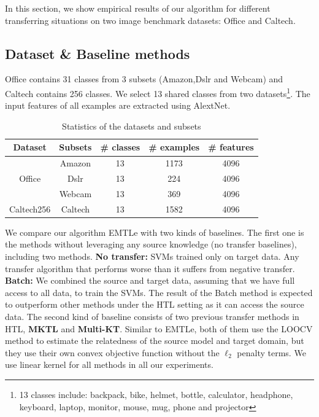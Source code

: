 In this section, we show empirical results of our algorithm for different transferring situations on two image benchmark datasets: Office and Caltech.
\subsection{Dataset \& Baseline methods}
Office contains 31 classes from 3 subsets (Amazon,Dslr and Webcam) and Caltech contains 256 classes. We select 13 shared classes from two datasets\footnote{13 classes include: backpack, bike, helmet, bottle, calculator, headphone, keyboard, laptop, monitor, mouse, mug, phone and projector}. The input features of all examples are extracted using AlextNet\cite{krizhevsky2012imagenet}.
\begin{table}[htbp]
	\centering
	\caption{Statistics of the datasets and subsets}
	\begin{tabular}{|c|c|c|c|c|}
		\hline
		Dataset&Subsets&\# classes &\# examples & \# features\\\hline
		\multirow{3}{*}{Office} & Amazon &13&1173 & 4096\\
		
		& Dslr &13&224 & 4096\\
		& Webcam &13&369 & 4096\\
		\hline
		Caltech256&Caltech&13&1582&4096\\
		\hline
	\end{tabular}%
	\label{tab:class_info}%
\end{table}%
We compare our algorithm EMTLe with two kinds of baselines. The first one is the methods without leveraging any source knowledge (no transfer baselines), including two methods. \textbf{No transfer:} SVMs trained only on target data. Any transfer algorithm that performs worse than it suffers from negative transfer. \textbf{Batch:} We combined the source and target data, assuming that we have full access to all data, to train the SVMs. The result of the Batch method is expected to outperform other methods under the HTL setting as it can access the source data. The second kind of baseline consists of two previous transfer methods in HTL, \textbf{MKTL\cite{jie2011multiclass}} and \textbf{Multi-KT\cite{tommasi2014learning}}. Similar to EMTLe, both of them use the LOOCV method to estimate the relatedness of the source model and target domain, but they use their own convex objective function without the $\ell_2$ penalty terms. We use linear kernel for all methods in all our experiments.
